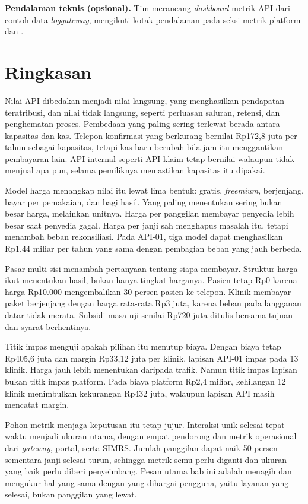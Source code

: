 \textbf{Pendalaman teknis (opsional).} Tim merancang \textit{dashboard} metrik API dari contoh data \textit{log}\textit{gateway}, mengikuti kotak pendalaman pada seksi metrik platform dan
.

\section{Ringkasan}

Nilai API dibedakan menjadi nilai langsung, yang menghasilkan pendapatan teratribusi, dan nilai tidak langsung, seperti perluasan saluran, retensi, dan penghematan proses. Pembedaan yang
paling sering terlewat berada antara kapasitas dan kas. Telepon konfirmasi yang berkurang bernilai Rp172,8 juta per tahun sebagai kapasitas, tetapi kas baru berubah bila jam itu
menggantikan pembayaran lain. API internal seperti API klaim tetap bernilai walaupun tidak menjual apa pun, selama pemiliknya memastikan kapasitas itu dipakai.

Model harga menangkap nilai itu lewat lima bentuk: gratis, \textit{freemium}, berjenjang, bayar per pemakaian, dan bagi hasil. Yang paling menentukan sering bukan besar harga, melainkan
unitnya. Harga per panggilan membayar penyedia lebih besar saat penyedia gagal. Harga per janji sah menghapus masalah itu, tetapi menambah beban rekonsiliasi. Pada API-01, tiga model dapat
menghasilkan Rp1,44 miliar per tahun yang sama dengan pembagian beban yang jauh berbeda.

Pasar multi-sisi menambah pertanyaan tentang siapa membayar. Struktur harga ikut menentukan hasil, bukan hanya tingkat harganya. Pasien tetap Rp0 karena harga Rp10.000 mengembalikan 30 persen
pasien ke telepon. Klinik membayar paket berjenjang dengan harga rata-rata Rp3 juta, karena beban pada langganan datar tidak merata. Subsidi masa uji senilai Rp720 juta ditulis bersama tujuan dan
syarat berhentinya.

Titik impas menguji apakah pilihan itu menutup biaya. Dengan biaya tetap Rp405,6 juta dan margin Rp33,12 juta per klinik, lapisan API-01 impas pada 13 klinik. Harga jauh lebih menentukan daripada
trafik. Namun titik impas lapisan bukan titik impas platform. Pada biaya platform Rp2,4 miliar, kehilangan 12 klinik menimbulkan kekurangan Rp432 juta, walaupun lapisan API masih mencatat margin.

Pohon metrik menjaga keputusan itu tetap jujur. Interaksi unik selesai tepat waktu menjadi ukuran utama, dengan empat pendorong dan metrik operasional dari \textit{gateway}, portal, serta SIMRS.
Jumlah panggilan dapat naik 50 persen sementara janji selesai turun, sehingga metrik semu perlu diganti dan ukuran yang baik perlu diberi penyeimbang. Pesan utama bab ini adalah menagih dan mengukur
hal yang sama dengan yang dihargai pengguna, yaitu layanan yang selesai, bukan panggilan yang lewat.

